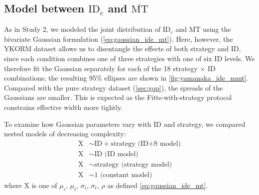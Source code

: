 \documentclass[acmlarge, manuscript,review]{acmart}
\newcommand{\mmt}{\ensuremath{\overline{\mt}}\xspace}
\newcommand{\mt}{\ensuremath{{\text{MT}}}\xspace}
\newcommand{\ide}{\ensuremath{{\text{ID}_e}}\xspace}
\begin{document}

\subsection{Model between \ide and \mmt}
As in Study 2, we modeled the joint distribution of \ide and \mmt using the bivariate Gaussian formulation (\autoref{eq:gaussian_ide_mt}). Here, however, the YKORM dataset allows us to disentangle the effects of both strategy and ID, since each condition combines one of three strategies with one of six ID levels. We therefore fit the Gaussian separately for each of the 18 strategy $\times$ ID combinations; the resulting 95\% ellipses are shown in \autoref{fig:yamanaka_ide_mmt}.
Compared with the pure strategy dataset (\autoref{sec:gop}), the spreads of the Gaussians are smaller. This is expected as the Fitts-with-strategy protocol constrains effective width more tightly.

To examine how Gaussian parameters vary with ID and strategy, we compared nested models of decreasing complexity:
\begin{align}
  \text{X} & \sim \text{ID} + \text{strategy (ID+S model)}  \\
  \text{X} &\sim \text{ID (ID model)} \\
  \text{X} &\sim \text{strategy (strategy model)} \\
  \text{X} &\sim 1 \text{ (constant model)}
\end{align}
where X is one of $\mu_i$, $\mu_t$, $\sigma_i$, $\sigma_t$, $\rho$ as defined \autoref{eq:gaussian_ide_mt}.
\end{document}
